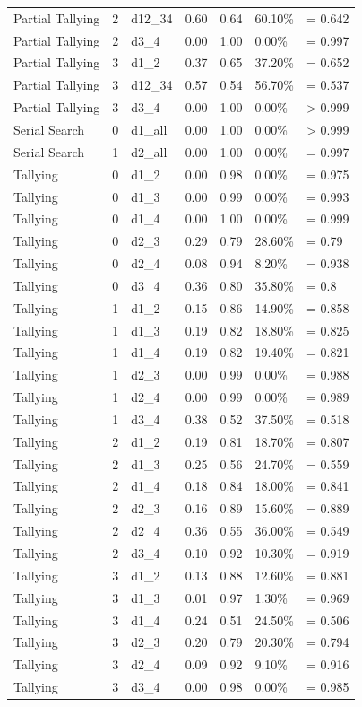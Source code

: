 \documentclass[
  english,
  man]{apa6}
\begin{document}
\begin{center}
\begin{ThreePartTable}
\begin{longtable}{lllllll}
Partial Tallying & 2 & d12\_34 & 0.60 & 0.64 & 60.10\% & = 0.642\\
Partial Tallying & 2 & d3\_4 & 0.00 & 1.00 & 0.00\% & = 0.997\\
Partial Tallying & 3 & d1\_2 & 0.37 & 0.65 & 37.20\% & = 0.652\\
Partial Tallying & 3 & d12\_34 & 0.57 & 0.54 & 56.70\% & = 0.537\\
Partial Tallying & 3 & d3\_4 & 0.00 & 1.00 & 0.00\% & > 0.999\\
Serial Search & 0 & d1\_all & 0.00 & 1.00 & 0.00\% & > 0.999\\
Serial Search & 1 & d2\_all & 0.00 & 1.00 & 0.00\% & = 0.997\\
Tallying & 0 & d1\_2 & 0.00 & 0.98 & 0.00\% & = 0.975\\
Tallying & 0 & d1\_3 & 0.00 & 0.99 & 0.00\% & = 0.993\\
Tallying & 0 & d1\_4 & 0.00 & 1.00 & 0.00\% & = 0.999\\
Tallying & 0 & d2\_3 & 0.29 & 0.79 & 28.60\% & = 0.79\\
Tallying & 0 & d2\_4 & 0.08 & 0.94 & 8.20\% & = 0.938\\
Tallying & 0 & d3\_4 & 0.36 & 0.80 & 35.80\% & = 0.8\\
Tallying & 1 & d1\_2 & 0.15 & 0.86 & 14.90\% & = 0.858\\
Tallying & 1 & d1\_3 & 0.19 & 0.82 & 18.80\% & = 0.825\\
Tallying & 1 & d1\_4 & 0.19 & 0.82 & 19.40\% & = 0.821\\
Tallying & 1 & d2\_3 & 0.00 & 0.99 & 0.00\% & = 0.988\\
Tallying & 1 & d2\_4 & 0.00 & 0.99 & 0.00\% & = 0.989\\
Tallying & 1 & d3\_4 & 0.38 & 0.52 & 37.50\% & = 0.518\\
Tallying & 2 & d1\_2 & 0.19 & 0.81 & 18.70\% & = 0.807\\
Tallying & 2 & d1\_3 & 0.25 & 0.56 & 24.70\% & = 0.559\\
Tallying & 2 & d1\_4 & 0.18 & 0.84 & 18.00\% & = 0.841\\
Tallying & 2 & d2\_3 & 0.16 & 0.89 & 15.60\% & = 0.889\\
Tallying & 2 & d2\_4 & 0.36 & 0.55 & 36.00\% & = 0.549\\
Tallying & 2 & d3\_4 & 0.10 & 0.92 & 10.30\% & = 0.919\\
Tallying & 3 & d1\_2 & 0.13 & 0.88 & 12.60\% & = 0.881\\
Tallying & 3 & d1\_3 & 0.01 & 0.97 & 1.30\% & = 0.969\\
Tallying & 3 & d1\_4 & 0.24 & 0.51 & 24.50\% & = 0.506\\
Tallying & 3 & d2\_3 & 0.20 & 0.79 & 20.30\% & = 0.794\\
Tallying & 3 & d2\_4 & 0.09 & 0.92 & 9.10\% & = 0.916\\
Tallying & 3 & d3\_4 & 0.00 & 0.98 & 0.00\% & = 0.985\\
\bottomrule
\end{longtable}

\end{ThreePartTable}
\end{center}
\end{document}
